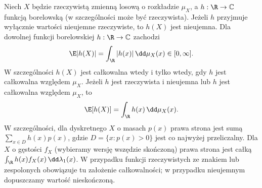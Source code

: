 \begin{twierdzenie}
Niech $X$ będzie rzeczywistą zmienną losową o rozkładzie $\mu_X$,
a $h:\R\to\mathbb C$ funkcją borelowską (w szczególności
może być rzeczywista). Jeżeli $h$ przyjmuje wyłącznie
wartości nieujemne rzeczywiste, to $h(X)$ jest nieujemna.
Dla dowolnej funkcji borelowskiej $h:\R\to\mathbb C$
zachodzi
\[
\E|h(X)|=\int_\R|h(x)|\,\dd\mu_X(x)\in[0,\infty].
\]
W szczególności $h(X)$ jest całkowalna wtedy i tylko wtedy,
gdy $h$ jest całkowalna względem $\mu_X$.
Jeżeli $h$ jest rzeczywista i nieujemna lub $h$ jest
całkowalna względem $\mu_X$, to
\begin{equation}\label{eq:lotus}
\E[h(X)]=\int_\R h(x)\,\dd\mu_X(x).
\end{equation}
W szczególności, dla dyskretnego $X$ o masach $p(x)$ prawa strona
jest sumą $\sum_{x\in D}h(x)p(x)$, gdzie
$D=\{x:p(x)>0\}$ jest co najwyżej przeliczalny.
Dla $X$ o gęstości $f_X$ (wybieramy wersję wszędzie
skończoną) prawa strona jest całką
$\int_\R h(x)f_X(x)\,\dd\lambda_1(x)$.
W przypadku funkcji rzeczywistych ze znakiem lub zespolonych
obowiązuje tu założenie całkowalności; w przypadku nieujemnym
dopuszczamy wartość nieskończoną.
\end{twierdzenie}
